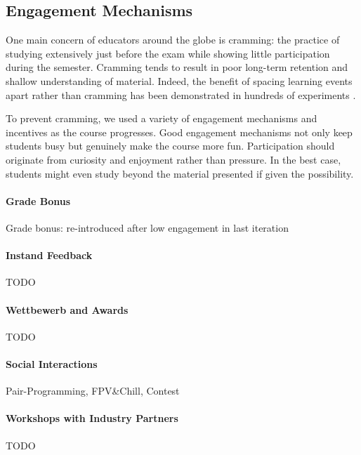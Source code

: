 \subsection{Engagement Mechanisms}

One main concern of educators around the globe is cramming:
the practice of studying extensively just before the exam while
showing little participation during the semester.
Cramming tends to result in poor long-term retention and shallow understanding
of material.
Indeed, the benefit of spacing learning events apart rather than cramming has been demonstrated in hundreds of experiments \citep{cramming1,cramming2}.

To prevent cramming,
we used a variety of engagement mechanisms and incentives as the course progresses.
Good engagement mechanisms not only keep students busy
but genuinely make the course more fun.
Participation should originate from curiosity and enjoyment rather than pressure.
In the best case, students might even study beyond the material presented
if given the possibility.

\paragraph{Grade Bonus}
Grade bonus: re-introduced after low engagement in last iteration

\paragraph{Instand Feedback}
TODO

\paragraph{Wettbewerb and Awards}
TODO

\paragraph{Social Interactions}
Pair-Programming, FPV\&Chill, Contest

\paragraph{Workshops with Industry Partners}
TODO

